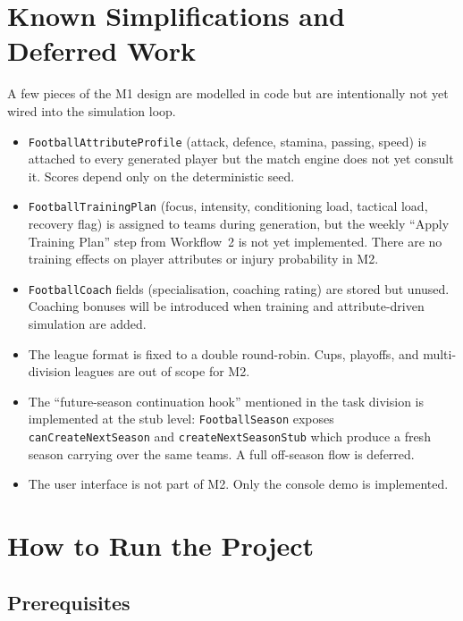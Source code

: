 \documentclass[11pt, a4paper]{article}
\newcommand{\code}[1]{\texttt{#1}}
\begin{document}
\section{Known Simplifications and Deferred Work}

A few pieces of the M1 design are modelled in code but are intentionally
not yet wired into the simulation loop.

\begin{itemize}
    \item \code{FootballAttributeProfile} (attack, defence, stamina,
          passing, speed) is attached to every generated player but the
          match engine does not yet consult it. Scores depend only on the
          deterministic seed.
    \item \code{FootballTrainingPlan} (focus, intensity, conditioning
          load, tactical load, recovery flag) is assigned to teams during
          generation, but the weekly ``Apply Training Plan'' step from
          Workflow~2 is not yet implemented. There are no training effects
          on player attributes or injury probability in M2.
    \item \code{FootballCoach} fields (specialisation, coaching rating)
          are stored but unused. Coaching bonuses will be introduced
          when training and attribute-driven simulation are added.
    \item The league format is fixed to a double round-robin. Cups, playoffs,
          and multi-division leagues are out of scope for M2.
    \item The ``future-season continuation hook'' mentioned in the task
          division is implemented at the stub level: \code{FootballSeason}
          exposes \code{canCreateNextSeason} and \code{createNextSeasonStub}
          which produce a fresh season carrying over the same teams. A full
          off-season flow is deferred.
    \item The user interface is not part of M2. Only the console demo
          is implemented.
\end{itemize}

\section{How to Run the Project}

\subsection{Prerequisites}
\end{document}
